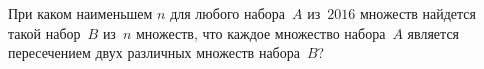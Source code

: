\begin{problems}
\item
При каком наименьшем $n$ для любого набора~$A$ из~$2016$ множеств найдется
такой набор~$B$ из~$n$ множеств, что каждое множество набора~$A$ является
пересечением двух различных множеств набора~$B$?



\end{problems}

